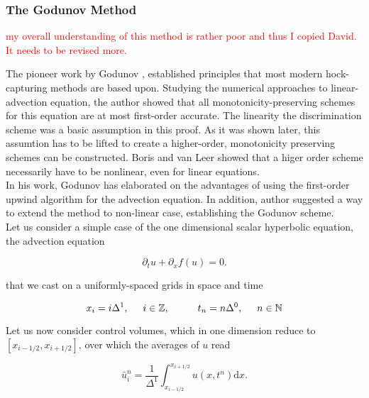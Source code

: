 \documentclass[11pt,a4paper,headinclude=true,DIV=14,BCOR=8mm,chapterprefix,listof=totoc,twoside,openright,abstracton]{scrbook}
\begin{document}
\subsubsection{The Godunov Method}
\textcolor{red}{my overall understanding of this method is rather poor and thus I copied David. It needs to be revised more.}

The pioneer work by Godunov \cite{Godunov:1959}, established principles that most modern hock-capturing methods are based upon. Studying the numerical approaches to linear-advection equation, the author showed that all monotonicity-preserving schemes for this equation are at most first-order accurate. The linearity the discrimination scheme was a basic assumption in this proof. As it was shown later, this assumtion has to be lifted to create a higher-order, monotonicity preserving schemes can be constructed. Boris \cite{Boris:1971} and van Leer \cite{vanLeer:1973} showed that a higer order scheme necessarily have to be nonlinear, even for linear equations. \\

In his work, Godunov has elaborated on the advantages of using the first-order upwind algorithm for the advection equation. In addition, author suggested a way to extend the method to non-linear case, establishing the Godunov scheme. \\

Let us consider a simple case of the one dimensional scalar hyperbolic equation, the advection equation

\begin{equation}
    \partial_t u + \partial_x f(u) = 0.
    \label{eq:theory:fv:adveq}
\end{equation}

that we cast on a uniformly-spaced grids in space and time 

\begin{equation}
    x_i = i\Delta^1, \hspace{5mm} i\in\mathbb{Z}, \hspace{10mm} t_n = n\Delta^0, \hspace{5mm} n\in\mathbb{N}
\end{equation}

Let us now consider control volumes, which in one dimension reduce to $[x_{i-1/2},x_{i+1/2}]$, over which the averages of $u$ read

\begin{equation}
    \bar{u}_i ^n = \frac{1}{\Delta^1}\int_{x_{i-1/2}}^{x_{i + 1/2}} u(x, t^n) \text{d}x.
\end{equation}
\end{document}
